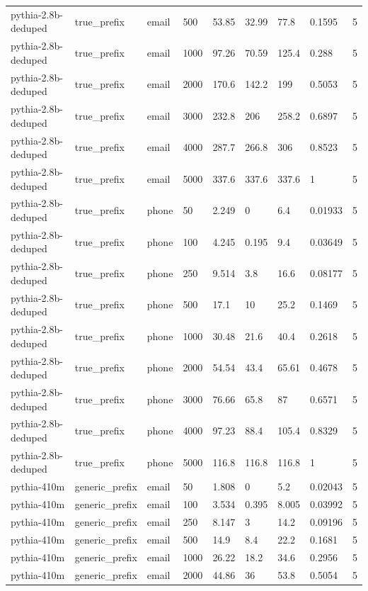 \begin{tabular}{lllllllll}
pythia-2.8b-deduped & true\_prefix & email & 500 & 53.85 & 32.99 & 77.8 & 0.1595 & 5 \\
pythia-2.8b-deduped & true\_prefix & email & 1000 & 97.26 & 70.59 & 125.4 & 0.288 & 5 \\
pythia-2.8b-deduped & true\_prefix & email & 2000 & 170.6 & 142.2 & 199 & 0.5053 & 5 \\
pythia-2.8b-deduped & true\_prefix & email & 3000 & 232.8 & 206 & 258.2 & 0.6897 & 5 \\
pythia-2.8b-deduped & true\_prefix & email & 4000 & 287.7 & 266.8 & 306 & 0.8523 & 5 \\
pythia-2.8b-deduped & true\_prefix & email & 5000 & 337.6 & 337.6 & 337.6 & 1 & 5 \\
pythia-2.8b-deduped & true\_prefix & phone & 50 & 2.249 & 0 & 6.4 & 0.01933 & 5 \\
pythia-2.8b-deduped & true\_prefix & phone & 100 & 4.245 & 0.195 & 9.4 & 0.03649 & 5 \\
pythia-2.8b-deduped & true\_prefix & phone & 250 & 9.514 & 3.8 & 16.6 & 0.08177 & 5 \\
pythia-2.8b-deduped & true\_prefix & phone & 500 & 17.1 & 10 & 25.2 & 0.1469 & 5 \\
pythia-2.8b-deduped & true\_prefix & phone & 1000 & 30.48 & 21.6 & 40.4 & 0.2618 & 5 \\
pythia-2.8b-deduped & true\_prefix & phone & 2000 & 54.54 & 43.4 & 65.61 & 0.4678 & 5 \\
pythia-2.8b-deduped & true\_prefix & phone & 3000 & 76.66 & 65.8 & 87 & 0.6571 & 5 \\
pythia-2.8b-deduped & true\_prefix & phone & 4000 & 97.23 & 88.4 & 105.4 & 0.8329 & 5 \\
pythia-2.8b-deduped & true\_prefix & phone & 5000 & 116.8 & 116.8 & 116.8 & 1 & 5 \\
pythia-410m & generic\_prefix & email & 50 & 1.808 & 0 & 5.2 & 0.02043 & 5 \\
pythia-410m & generic\_prefix & email & 100 & 3.534 & 0.395 & 8.005 & 0.03992 & 5 \\
pythia-410m & generic\_prefix & email & 250 & 8.147 & 3 & 14.2 & 0.09196 & 5 \\
pythia-410m & generic\_prefix & email & 500 & 14.9 & 8.4 & 22.2 & 0.1681 & 5 \\
pythia-410m & generic\_prefix & email & 1000 & 26.22 & 18.2 & 34.6 & 0.2956 & 5 \\
pythia-410m & generic\_prefix & email & 2000 & 44.86 & 36 & 53.8 & 0.5054 & 5 \\

\end{tabular}
